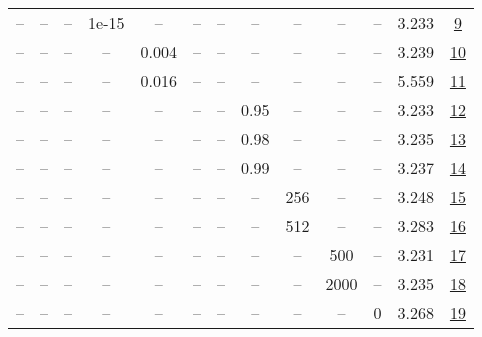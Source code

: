 \begin{table}[H]
\begin{tabular}{ccccccccccccc}
-- & -- & -- & 1e-15 & -- & -- & -- & -- & -- & -- & -- & 3.233 & \href{https://wandb.ai/stanford-mercury/optimizer-scaling/runs/sweep-300m-6B-soape50b1f7lr0.008-wd0.1-minlr0-warmup1000-b10.95--3af6e1}{9} \\
-- & -- & -- & -- & 0.004 & -- & -- & -- & -- & -- & -- & 3.239 & \href{https://wandb.ai/stanford-mercury/optimizer-scaling/runs/sweep-300m-6B-soape061dfclr0.004-wd0.1-minlr0-warmup1000-b10.95--018deb}{10} \\
-- & -- & -- & -- & 0.016 & -- & -- & -- & -- & -- & -- & 5.559 & \href{https://wandb.ai/stanford-mercury/optimizer-scaling/runs/sweep-300m-6B-soape7e3563lr0.016-wd0.1-minlr0-warmup1000-b10.95--40c60b}{11} \\
-- & -- & -- & -- & -- & -- & -- & 0.95 & -- & -- & -- & 3.233 & \href{https://wandb.ai/stanford-mercury/optimizer-scaling/runs/sweep-300m-6B-soape25236blr0.008-wd0.1-minlr0-warmup1000-b10.95--dbd1b7}{12} \\
-- & -- & -- & -- & -- & -- & -- & 0.98 & -- & -- & -- & 3.235 & \href{https://wandb.ai/stanford-mercury/optimizer-scaling/runs/sweep-300m-6B-soapef3648blr0.008-wd0.1-minlr0-warmup1000-b10.95--cf19b4}{13} \\
-- & -- & -- & -- & -- & -- & -- & 0.99 & -- & -- & -- & 3.237 & \href{https://wandb.ai/stanford-mercury/optimizer-scaling/runs/sweep-300m-6B-soapedb7dddlr0.008-wd0.1-minlr0-warmup1000-b10.95--c19b93}{14} \\
-- & -- & -- & -- & -- & -- & -- & -- & 256 & -- & -- & 3.248 & \href{https://wandb.ai/stanford-mercury/optimizer-scaling/runs/sweep-300m-6B-soapef80782lr0.008-wd0.1-minlr0-warmup1000-b10.95--c17c71}{15} \\
-- & -- & -- & -- & -- & -- & -- & -- & 512 & -- & -- & 3.283 & \href{https://wandb.ai/stanford-mercury/optimizer-scaling/runs/sweep-300m-6B-soape026546lr0.008-wd0.1-minlr0-warmup1000-b10.95--4f8aad}{16} \\
-- & -- & -- & -- & -- & -- & -- & -- & -- & 500 & -- & 3.231 & \href{https://wandb.ai/stanford-mercury/optimizer-scaling/runs/sweep-300m-6B-soape8f4696lr0.008-wd0.1-minlr0-warmup500-b10.95-b-2e6627}{17} \\
-- & -- & -- & -- & -- & -- & -- & -- & -- & 2000 & -- & 3.235 & \href{https://wandb.ai/stanford-mercury/optimizer-scaling/runs/sweep-300m-6B-soape0d086clr0.008-wd0.1-minlr0-warmup2000-b10.95--58d115}{18} \\
-- & -- & -- & -- & -- & -- & -- & -- & -- & -- & 0 & 3.268 & \href{https://wandb.ai/stanford-mercury/optimizer-scaling/runs/sweep-300m-6B-soapebf0b4dlr0.008-wd0-minlr0-warmup1000-b10.95-b2-f94927}{19} \\

\end{tabular}
\end{table}
